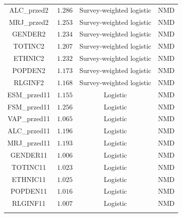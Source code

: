 \begin{tabular}{@{\extracolsep{5pt}} cccc}
ALC\_przed2 & $1.286$ & Survey-weighted logistic & NMD \\ 
MRJ\_przed2 & $1.253$ & Survey-weighted logistic & NMD \\ 
GENDER2 & $1.234$ & Survey-weighted logistic & NMD \\ 
TOTINC2 & $1.207$ & Survey-weighted logistic & NMD \\ 
ETHNIC2 & $1.232$ & Survey-weighted logistic & NMD \\ 
POPDEN2 & $1.173$ & Survey-weighted logistic & NMD \\ 
RLGINF2 & $1.168$ & Survey-weighted logistic & NMD \\ 
ESM\_przed11 & $1.155$ & Logistic & NMD \\ 
FSM\_przed11 & $1.256$ & Logistic & NMD \\ 
VAP\_przed11 & $1.065$ & Logistic & NMD \\ 
ALC\_przed11 & $1.196$ & Logistic & NMD \\ 
MRJ\_przed11 & $1.193$ & Logistic & NMD \\ 
GENDER11 & $1.006$ & Logistic & NMD \\ 
TOTINC11 & $1.023$ & Logistic & NMD \\ 
ETHNIC11 & $1.025$ & Logistic & NMD \\ 
POPDEN11 & $1.016$ & Logistic & NMD \\ 
RLGINF11 & $1.007$ & Logistic & NMD \\ 
\hline \\[-1.8ex] 
\end{tabular} 
